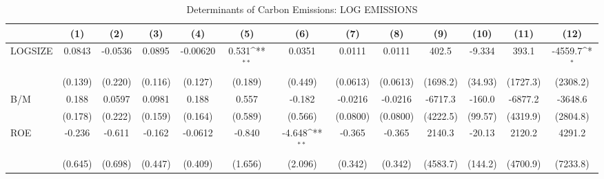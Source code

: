 \begin{table}[htbp]\centering
\def\sym#1{\ifmmode^{#1}\else\(^{#1}\)\fi}
\caption{Determinants of Carbon Emissions: LOG EMISSIONS}
\begin{tabular}{l*{12}{c}}
\hline\hline
                    &\multicolumn{1}{c}{(1)}         &\multicolumn{1}{c}{(2)}         &\multicolumn{1}{c}{(3)}         &\multicolumn{1}{c}{(4)}         &\multicolumn{1}{c}{(5)}         &\multicolumn{1}{c}{(6)}         &\multicolumn{1}{c}{(7)}         &\multicolumn{1}{c}{(8)}         &\multicolumn{1}{c}{(9)}         &\multicolumn{1}{c}{(10)}         &\multicolumn{1}{c}{(11)}         &\multicolumn{1}{c}{(12)}         \\
\hline
LOGSIZE             &      0.0843         &     -0.0536         &      0.0895         &    -0.00620         &       0.531\sym{**} &      0.0351         &      0.0111         &      0.0111         &       402.5         &      -9.334         &       393.1         &     -4559.7\sym{*}  \\
                    &     (0.139)         &     (0.220)         &     (0.116)         &     (0.127)         &     (0.189)         &     (0.449)         &    (0.0613)         &    (0.0613)         &    (1698.2)         &     (34.93)         &    (1727.3)         &    (2308.2)         \\
B/M                 &       0.188         &      0.0597         &      0.0981         &       0.188         &       0.557         &      -0.182         &     -0.0216         &     -0.0216         &     -6717.3         &      -160.0         &     -6877.2         &     -3648.6         \\
                    &     (0.178)         &     (0.222)         &     (0.159)         &     (0.164)         &     (0.589)         &     (0.566)         &    (0.0800)         &    (0.0800)         &    (4222.5)         &     (99.57)         &    (4319.9)         &    (2804.8)         \\
ROE                 &      -0.236         &      -0.611         &      -0.162         &     -0.0612         &      -0.840         &      -4.648\sym{**} &      -0.365         &      -0.365         &      2140.3         &      -20.13         &      2120.2         &      4291.2         \\
                    &     (0.645)         &     (0.698)         &     (0.447)         &     (0.409)         &     (1.656)         &     (2.096)         &     (0.342)         &     (0.342)         &    (4583.7)         &     (144.2)         &    (4700.9)         &    (7233.8)         \\

\end{tabular}
\end{table}

